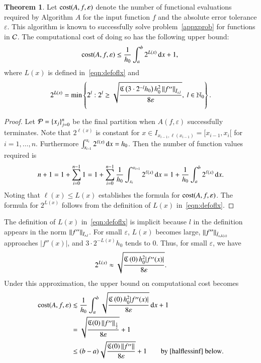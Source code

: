 \documentclass[review]{elsarticle}
\newcommand{\abstol}{\varepsilon}
\theoremstyle{definition}
\newtheorem{theorem}{Theorem}
\begin{document}
\begin{theorem}\label{thm:cost}
Let $\cost(A,f,\abstol)$ denote the number of functional evaluations required by Algorithm $A$ for the input function $f$ and the absolute error tolerance $\abstol$.  This algorithm is known to successfully solve problem~\eqref{appxprob} for functions in $\cc$.  The computational cost of doing so has the following upper bound:
\begin{equation*}
\cost(A,f,\abstol) \le \frac{1}{h_0}\int_a^b 2^{L(x)} \, \dif x +1 , \\
\end{equation*}
where $L(x)$ is defined in~\eqref{eqn:defoflx} and
\begin{equation*}
2^{L(x)} = \min\left\{2^l:  2^l \ge \sqrt{\frac{\fC\left(3\cdot 2^{-l} h_0\right) h_0^2 \norm[\bar{I}_{x,l}]{f''} }{8 \abstol}}, \  l \in  \natzero\right\}.
\end{equation*}
\end{theorem}

\begin{proof}
Let $\cp=\{x_j\}_{j=0}^n$ be the final partition when $A(f,\abstol)$ successfully terminates. Note that $2^{\ell(x)}$ is constant for  $x \in I_{x_{i-1},\ell(x_{i-1})} = [x_{i-1},x_{i}[$ for $i=1, \ldots, n$.  Furthermore  $\int_{x_{i-1}}^{x_{i}} 2^{\ell(x)} \, \dif  x =  h_0$.  Then the number of function values required is
\begin{equation*}
n+1 = 1 + \sum_{i=0}^{n-1} 1 = 1 + \sum_{i=0}^{n-1} \frac{1}{h_0} \int_{x_i}^{x_{i+1}} 2^{\ell(x)} \, \dif  x = 1 + \frac{1}{h_0}\int_a^b 2^{\ell(x)} \, \dif x.
\end{equation*}
Noting that $\ell(x) \le L(x)$ establishes the formula for $\cost(A,f,\abstol)$.  The formula for $2^{L(x)}$ follows from the definition of $L(x)$
in~\eqref{eqn:defoflx}.
\end{proof}

The definition of $L(x)$ in~\eqref{eqn:defoflx} is implicit because $l$ in the definition appears in the norm $\norm[\bar{I}_{x,l}]{f''}$.  For small $\abstol$, $L(x)$ becomes large,  $\norm[\bar{I}_{x,L(x)}]{f''}$ approaches $|f''(x)|$, and $3\cdot 2^{-L(x)}h_0$ tends to $0$.  Thus, for small $\abstol$, we have
\begin{equation} \label{twoLxapprox}
 2^{L(x)} \approx \sqrt{\frac{\fC\left(0\right)  h_0^2 |f''(x)|}{8\abstol}}.
 \end{equation}
Under this approximation, the upper bound on computational cost becomes
\begin{align}
\nonumber
\cost(A,f,\abstol)  &\lesssim \frac{1}{h_0}\int_a^b \sqrt{\frac{\fC\left(0\right)  h_0^2 |f''(x)|}{8\abstol}} \, \dif x +1 \\
& =\sqrt{\frac{\fC(0) \norm[\frac 12]{f''}}{8\abstol}} +1 \label{costbdapprox} \\
& \le (b-a)\sqrt{\frac{\fC(0) \norm{f''}}{8\abstol}} +1 \label{costbdinf}  \qquad \text{by \eqref{halflessinf} below}.
\end{align}
\end{document}
